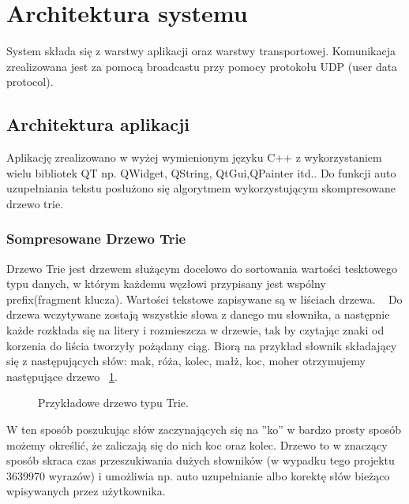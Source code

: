 \documentclass[twoside,a4paper]{book}
\begin{document}
\section{Architektura systemu}
System składa się z warstwy aplikacji oraz warstwy transportowej. Komunikacja zrealizowana jest za pomocą broadcastu przy pomocy protokołu UDP (user data protocol). 

\subsection{Architektura aplikacji}
Aplikację zrealizowano w wyżej wymienionym języku C++ z wykorzystaniem wielu bibliotek QT np. QWidget, QString, QtGui,QPainter itd.. Do funkcji auto uzupełniania tekstu posłużono się algorytmem wykorzystującym skompresowane drzewo trie. 
\subsubsection{Sompresowane Drzewo Trie}  \label{sec:trie}
Drzewo Trie jest drzewem służącym docelowo do sortowania wartości tesktowego typu danych, w którym każdemu węzłowi przypisany jest  wspólny prefix(fragment klucza). Wartości tekstowe zapisywane są w liściach drzewa. ~\citep{trieTree}
Do drzewa wczytywane zostają wszystkie słowa z danego mu słownika, a następnie każde rozkłada się na litery i rozmieszcza w drzewie, tak by czytając znaki od korzenia do liścia tworzyły pożądany ciąg. Biorą na przykład słownik składający się z następujących słów: mak, róża, kolec, małż, koc, moher otrzymujemy następujące drzewo ~\ref{fig:trie}.
\begin{figure}[!h]
		\centering
		\caption{Przykładowe drzewo typu Trie. }
		\label{fig:trie}
\end{figure}
W ten sposób poszukując słów zaczynających się na ''ko'' w bardzo prosty sposób możemy określić, że zaliczają się do nich koc oraz kolec. 
Drzewo to w znaczący sposób skraca czas przeszukiwania dużych słowników (w wypadku tego projektu 3639970 wyrazów) i umożliwia np. auto uzupełnianie albo korektę słów bieżąco wpisywanych przez użytkownika.
\end{document}
